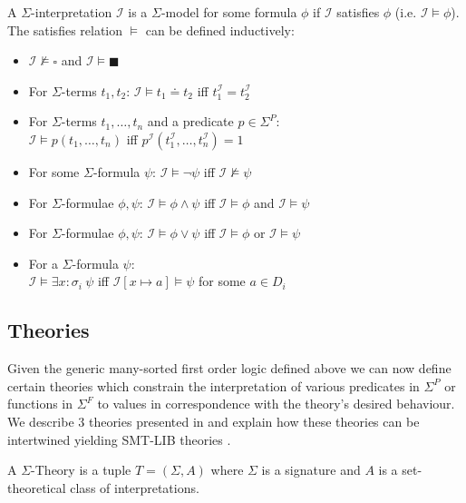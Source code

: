 \begin{definition}
A $\Sigma$-interpretation $\mathcal{I}$ is a $\Sigma$-model for some formula $\phi$ if $\mathcal{I}$ satisfies $\phi$ (i.e. $\mathcal{I}\vDash\phi$).\\
The satisfies relation $\vDash$ can be defined inductively:
\begin{itemize}
    \item $\mathcal{I} \nvDash \square$ and $\mathcal{I} \vDash \blacksquare$
    \item For $\Sigma$-terms $t_1, t_2$: 
    $\mathcal{I}\vDash t_1\doteq t_2$ iff $t_1^\mathcal{I}=t_2^\mathcal{I}$ 
    \item For $\Sigma$-terms $t_1,\dots,t_n$ and a predicate $p\in\Sigma^P$:\\
    $\mathcal{I}\vDash p\left(t_1,\dots,t_n\right)$ iff $p^\mathcal{I}(t_1^\mathcal{I},\dots,t^\mathcal{I}_n)=1$ 
    \item For some $\Sigma$-formula $\psi$:
    $\mathcal{I}\vDash \neg\psi$ iff $\mathcal{I} \nvDash \psi$
    \item For $\Sigma$-formulae $\phi, \psi$:
    $\mathcal{I}\vDash \phi\land\psi$ iff $\mathcal{I}\vDash\phi$ and $\mathcal{I}\vDash\psi$
    \item For $\Sigma$-formulae $\phi, \psi$:
    $\mathcal{I}\vDash \phi\lor\psi$ iff $\mathcal{I}\vDash\phi$ or $\mathcal{I}\vDash\psi$ 
    \item For a $\Sigma$-formula $\psi$:\\
    $\mathcal{I}\vDash \exists x\colon\!\sigma_i\ \psi$ iff $\mathcal{I}\left[x\mapsto a\right] \vDash \psi$ for some $a\in D_i$
\end{itemize}
\end{definition}

\subsection{Theories}
Given the generic many-sorted first order logic defined above we can now define certain theories which constrain the interpretation of various predicates in $\Sigma^P$ or functions in $\Sigma^F$ to values in correspondence with the theory's desired behaviour. We describe 3 theories presented in \cite{Barrett-Tinelli-SMT} and explain how these theories can be intertwined yielding SMT-LIB theories \cite{BarFT-SMTLIB}.

\begin{definition}
A $\Sigma$-Theory is a tuple $T=\left(\Sigma,A\right)$ where $\Sigma$ is a signature and $A$ is a set-theoretical class of interpretations.
\end{definition}

